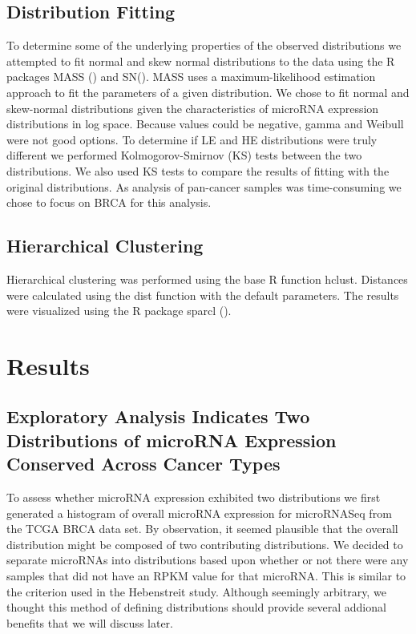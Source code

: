 \documentclass[12pt]{report}
\begin{document}
\subsection*{Distribution Fitting}
 To determine some of the underlying properties of the observed distributions we attempted to fit normal and skew normal distributions to the data using the R packages MASS () and SN(). MASS uses
 a maximum-likelihood estimation approach to fit the parameters of a given distribution. We chose to fit normal and skew-normal distributions given the characteristics of
 microRNA expression distributions in log space. Because values could be negative, gamma and Weibull were not good options. To determine if LE and HE distributions were truly different we performed
 Kolmogorov-Smirnov (KS) tests between the two distributions. We also used KS tests to compare the results of fitting with the original distributions. As analysis of pan-cancer samples was time-consuming
 we chose to focus on BRCA for this analysis.

\subsection*{Hierarchical Clustering}
Hierarchical clustering was performed using the base R function hclust. Distances were calculated using the dist function with the default parameters. The results were visualized using
the R package sparcl ().

\section*{Results}
\subsection*{Exploratory Analysis Indicates Two Distributions of microRNA Expression Conserved Across Cancer Types}
To assess whether microRNA expression exhibited two distributions we first generated a histogram of overall microRNA expression
for microRNASeq from the TCGA BRCA data set. By observation, it seemed plausible that the overall distribution might be composed of two contributing distributions.
We decided to separate microRNAs into distributions based upon whether or not there were any samples that did not have an RPKM value for that microRNA.
This is similar to the criterion used in the Hebenstreit study. Although seemingly arbitrary, we thought this method of defining distributions should
provide several addional benefits that we will discuss later. %
\end{document}
